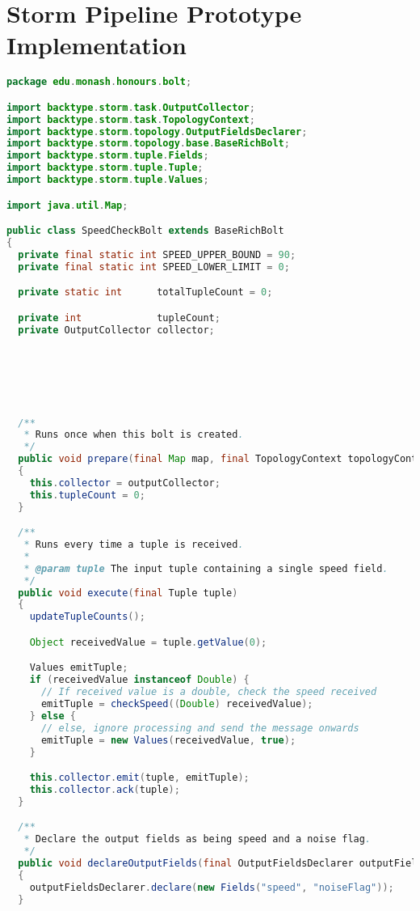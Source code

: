 \clearpage
\chapter{Storm Pipeline Prototype Implementation}
\label{lst:storm}

\begin{lstlisting}[language=java,caption=edu.monash.honours.bolt.SpeedCheckBolt (Java)]
package edu.monash.honours.bolt;

import backtype.storm.task.OutputCollector;
import backtype.storm.task.TopologyContext;
import backtype.storm.topology.OutputFieldsDeclarer;
import backtype.storm.topology.base.BaseRichBolt;
import backtype.storm.tuple.Fields;
import backtype.storm.tuple.Tuple;
import backtype.storm.tuple.Values;

import java.util.Map;

public class SpeedCheckBolt extends BaseRichBolt
{
  private final static int SPEED_UPPER_BOUND = 90;
  private final static int SPEED_LOWER_LIMIT = 0;

  private static int      totalTupleCount = 0;

  private int             tupleCount;
  private OutputCollector collector;






  /**
   * Runs once when this bolt is created.
   */
  public void prepare(final Map map, final TopologyContext topologyContext, final OutputCollector outputCollector)
  {
    this.collector = outputCollector;
    this.tupleCount = 0;
  }

  /**
   * Runs every time a tuple is received.
   *
   * @param tuple The input tuple containing a single speed field.
   */
  public void execute(final Tuple tuple)
  {
    updateTupleCounts();

    Object receivedValue = tuple.getValue(0);

    Values emitTuple;
    if (receivedValue instanceof Double) {
      // If received value is a double, check the speed received
      emitTuple = checkSpeed((Double) receivedValue);
    } else {
      // else, ignore processing and send the message onwards
      emitTuple = new Values(receivedValue, true);
    }

    this.collector.emit(tuple, emitTuple);
    this.collector.ack(tuple);
  }

  /**
   * Declare the output fields as being speed and a noise flag.
   */
  public void declareOutputFields(final OutputFieldsDeclarer outputFieldsDeclarer)
  {
    outputFieldsDeclarer.declare(new Fields("speed", "noiseFlag"));
  }



\end{lstlisting}
